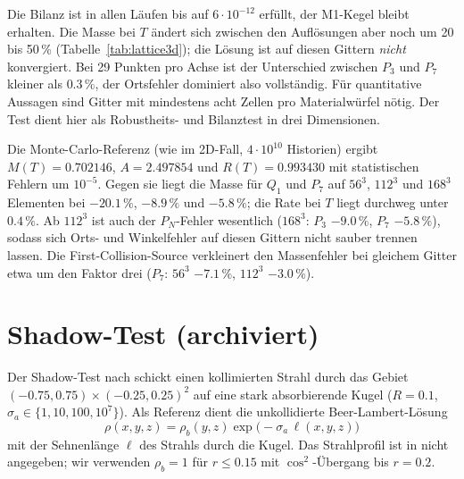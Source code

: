 Die Bilanz ist in allen Läufen bis auf $6\cdot10^{-12}$ erfüllt, der M1-Kegel bleibt erhalten. Die
Masse bei $T$ ändert sich zwischen den Auflösungen aber noch um 20 bis 50\,\%
(Tabelle~\ref{tab:lattice3d}); die Lösung ist auf diesen Gittern \emph{nicht} konvergiert. Bei
29 Punkten pro Achse ist der Unterschied zwischen $P_3$ und $P_7$ kleiner als $0.3\,\%$, der
Ortsfehler dominiert also vollständig. Für quantitative Aussagen sind Gitter mit mindestens acht
Zellen pro Materialwürfel nötig. Der Test dient hier als Robustheits- und Bilanztest in drei
Dimensionen.

Die Monte-Carlo-Referenz (wie im 2D-Fall, $4\cdot10^{10}$ Historien) ergibt $M(T)=0.702146$,
$A=2.497854$ und $R(T)=0.993430$ mit statistischen Fehlern um $10^{-5}$. Gegen sie liegt die Masse
für $Q_1$ und $P_7$ auf $56^3$, $112^3$ und $168^3$ Elementen bei $-20.1\,\%$, $-8.9\,\%$ und
$-5.8\,\%$; die Rate bei $T$ liegt durchweg unter $0.4\,\%$. Ab $112^3$ ist auch der
$P_N$-Fehler wesentlich ($168^3$: $P_3$ $-9.0\,\%$, $P_7$ $-5.8\,\%$), sodass sich Orts- und
Winkelfehler auf diesen Gittern nicht sauber trennen lassen. Die First-Collision-Source verkleinert
den Massenfehler bei gleichem Gitter etwa um den Faktor drei ($P_7$: $56^3$ $-7.1\,\%$, $112^3$
$-3.0\,\%$).

\section{Shadow-Test (archiviert)}
\label{sec:tests:shadow}

Der Shadow-Test nach \cite[Abschnitt~4.2.1]{weih_2020} schickt einen kollimierten Strahl durch
das Gebiet $(-0.75,0.75)\times(-0.25,0.25)^2$ auf eine stark absorbierende Kugel ($R=0.1$,
$\sigma_a\in\{1,10,100,10^7\}$). Als Referenz dient die unkollidierte Beer-Lambert-Lösung
\[
  \rho(x,y,z)=\rho_b(y,z)\exp\bigl(-\sigma_a\,\ell(x,y,z)\bigr)
\]
mit der Sehnenlänge $\ell$ des Strahls durch die Kugel. Das Strahlprofil ist in
\cite{weih_2020} nicht angegeben; wir verwenden $\rho_b=1$ für $r\le0.15$ mit
$\cos^2$-Übergang bis $r=0.2$.


